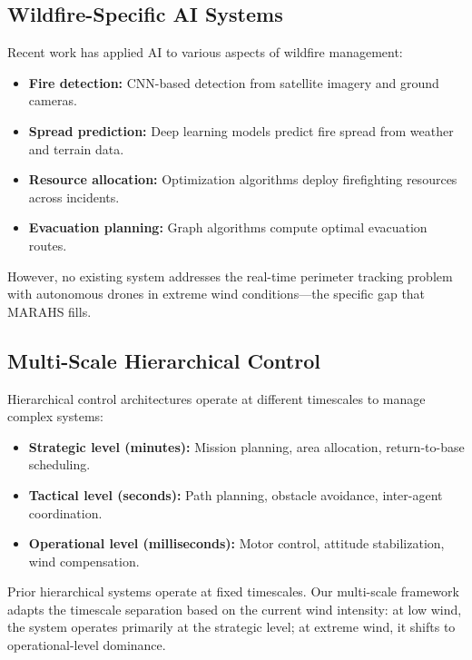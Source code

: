 \documentclass[12pt,a4paper]{article}
\begin{document}
\subsection{Wildfire-Specific AI Systems}

Recent work has applied AI to various aspects of wildfire management:

\begin{itemize}[leftmargin=*]
    \item \textbf{Fire detection:} CNN-based detection from satellite imagery and ground cameras.
    \item \textbf{Spread prediction:} Deep learning models predict fire spread from weather and terrain data.
    \item \textbf{Resource allocation:} Optimization algorithms deploy firefighting resources across incidents.
    \item \textbf{Evacuation planning:} Graph algorithms compute optimal evacuation routes.
\end{itemize}

However, no existing system addresses the real-time perimeter tracking problem with autonomous drones in extreme wind conditions---the specific gap that MARAHS fills.

\subsection{Multi-Scale Hierarchical Control}

Hierarchical control architectures operate at different timescales to manage complex systems:

\begin{itemize}[leftmargin=*]
    \item \textbf{Strategic level (minutes):} Mission planning, area allocation, return-to-base scheduling.
    \item \textbf{Tactical level (seconds):} Path planning, obstacle avoidance, inter-agent coordination.
    \item \textbf{Operational level (milliseconds):} Motor control, attitude stabilization, wind compensation.
\end{itemize}

Prior hierarchical systems \cite{Ioannou2012,Meehan2020} operate at fixed timescales. Our multi-scale framework adapts the timescale separation based on the current wind intensity: at low wind, the system operates primarily at the strategic level; at extreme wind, it shifts to operational-level dominance.
\end{document}
